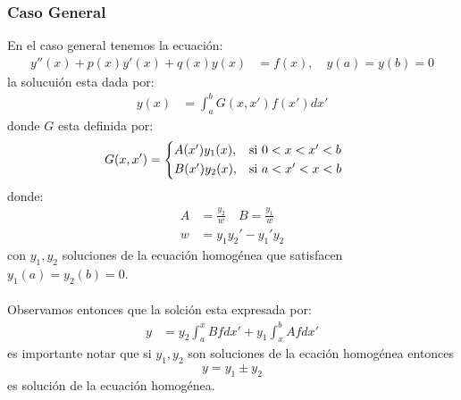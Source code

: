 \documentclass{article}
\begin{document}
\begin{tcolorbox}[breakable]
    \subsubsection*{Caso General}
    En el caso general tenemos la ecuación:
    \begin{align*}
        y''(x) + p(x)y'(x) + q(x)y(x) &= f(x), \quad y(a) = y(b) = 0
    \end{align*}
    la solucuión esta dada por:
    \begin{align*}
        y(x) &= \int_{a}^b G(x,x')f(x')dx'
    \end{align*}
    donde $G$ esta definida por:
    \begin{align*}
        G(x,x') &=
        \begin{cases*}
            A(x')y_1(x), & si $0<x<x'<b$ \\
            B(x')y_2(x),& si $a<x'<x<b$
        \end{cases*}  
    \end{align*}
    donde:
    \begin{align*}
        A &= \frac{y_2}{w} 
        \quad B = \frac{y_1}{w} \\ 
        w &= y_1y_2'-y_1'y_2
    \end{align*}
    con $y_1,y_2$ soluciones de la ecuación homogénea 
    que satisfacen $y_1(a) = y_2(b) = 0$. \\ \\
    Observamos entonces que la solción esta expresada por:
    \begin{align*}
        y &= y_2\int_{a}^x Bf dx' + y_1\int_{x}^b Afdx' 
    \end{align*}
    es importante notar que si $y_1, y_2$ son soluciones de la ecación homogénea
    entonces 
    \[ y = y_1 \pm y_2 \] 
    es solución de la ecuación homogénea.
    \newpage


\end{tcolorbox}
\end{document}
